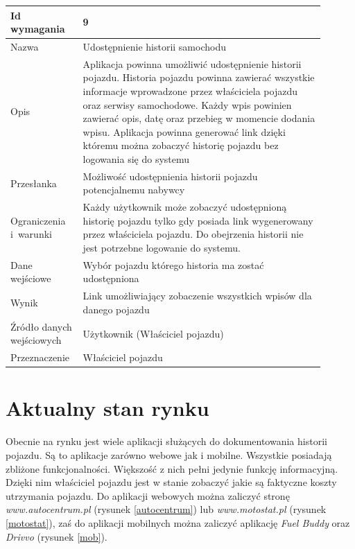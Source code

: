 \documentclass[12pt]{article}
\begin{document}
\begin{table}[H]
\begin{center}
	\begin{tabular}{|p{0.18\linewidth}|p{0.72\linewidth}|}%
	\hline
	Id wymagania 	& 9 				\\ \hline
	Nazwa			& Udostępnienie historii samochodu \\ \hline
	Opis &	Aplikacja powinna umożliwić udostępnienie historii pojazdu. Historia pojazdu powinna zawierać wszystkie informacje wprowadzone przez właściciela pojazdu oraz serwisy samochodowe. Każdy wpis powinien zawierać opis, datę oraz przebieg w momencie dodania wpisu. Aplikacja powinna generować link dzięki któremu można zobaczyć historię pojazdu bez logowania się do systemu \\ \hline
	Przesłanka & Możliwość udostępnienia historii pojazdu potencjalnemu nabywcy   \\ \hline
	Ograniczenia i~warunki & Każdy użytkownik może zobaczyć udostępnioną historię pojazdu tylko gdy posiada link wygenerowany przez właściciela pojazdu. Do obejrzenia historii nie jest potrzebne logowanie do systemu. \\ \hline
	Dane wejściowe &Wybór pojazdu którego historia ma zostać udostępniona \\ \hline
	Wynik & Link umożliwiający zobaczenie wszystkich wpisów dla danego pojazdu\\ \hline
	Źródło danych wejściowych &Użytkownik (Właściciel pojazdu)\\ \hline
	Przeznaczenie & Właściciel pojazdu\\ \hline
	\end{tabular}
\end{center}
\end{table}

\newpage
\section{Aktualny stan rynku }
	
Obecnie na rynku jest wiele aplikacji służących do dokumentowania historii pojazdu. Są to aplikacje zarówno webowe jak i mobilne. Wszystkie posiadają zbliżone funkcjonalności. Większość z nich pełni jedynie funkcję informacyjną. Dzięki nim właściciel pojazdu jest w stanie zobaczyć jakie są faktyczne koszty utrzymania pojazdu. Do aplikacji webowych można zaliczyć stronę \textit{www.autocentrum.pl} (rysunek \ref{autocentrum}) lub \textit{www.motostat.pl} (rysunek \ref{motostat}), zaś do aplikacji mobilnych można zaliczyć aplikację \textit{Fuel Buddy} oraz \textit{Drivvo} (rysunek \ref{mob}). \\
\end{document}
